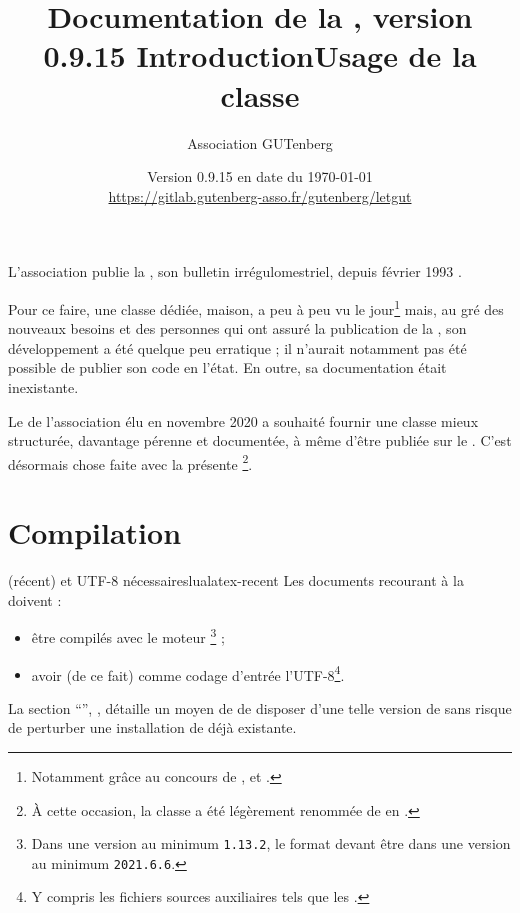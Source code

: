 \documentclass{letgut}
\title{%
  Documentation de la
  \texorpdfstring{%
    \letgutcls%
  }{%
    classe letgut%
  }%
  , version 0.9.15%
}
\author{Association GUTenberg}
\date{%
  Version 0.9.15 en date du \today%
  \texorpdfstring{%
    \\
    \url{https://gitlab.gutenberg-asso.fr/gutenberg/letgut}%
  }{%
  }%
}
\begin{document}

\title{Introduction}
\label{sec:introduction}
L'association \gutenberg{} publie la , son bulletin irrégulomestriel,
depuis février 1993 \autocite{AssociationGUTenbergLettreGUTenberg}.

Pour ce faire, une classe  dédiée, maison, a peu à peu vu le
jour\footnote{Notamment grâce au concours de ,
   et .} mais, au gré des
nouveaux besoins et des personnes qui ont assuré la publication de la ,
son développement a été quelque peu erratique ; il n'aurait notamment pas été
possible de publier son code en l'état. En outre, sa documentation était
inexistante.

Le \ca{} de l'association élu en novembre 2020 a souhaité fournir une classe
mieux structurée, davantage pérenne et documentée, à même d'être publiée sur le
\ctan{}. C'est désormais chose faite avec la présente \footnote{À
  cette occasion, la classe a été légèrement renommée de  en
  .}.

\title{Usage de la classe }
\label{sec:usage-de-la}

\section{Compilation}
\label{sec:compilation}

\begin{dbwarning}{ (récent) et UTF-8 nécessaires}{lualatex-recent}
  Les documents recourant à la  doivent :
  \begin{itemize}
  \item être compilés avec le moteur \footnote{Dans une version
      au minimum \texttt{1.13.2}, le format  devant être dans
      une version au minimum \texttt{2021.6.6}.} ;
  \item avoir (de ce fait) comme codage d'entrée l'UTF-8\footnote{Y compris les
      fichiers sources auxiliaires tels que les .}.
  \end{itemize}
\end{dbwarning}

La section \enquote{}, ,
détaille un moyen de de disposer d'une telle version de  sans
risque de perturber une installation de  déjà existante.
\end{document}
